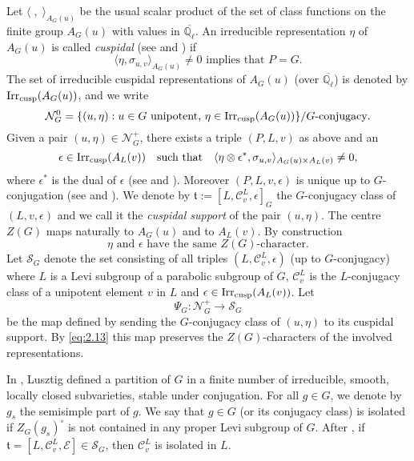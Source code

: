 \documentclass[11pt]{amsart}
\theoremstyle{definition}
\newcommand{\Q}{\mathbb Q}
\def\Irr{{\rm Irr}}
\def\cC{{\mathcal C}}
\def\cS{{\mathcal S}}
\def\cN{{\mathcal N}}
\def\cE{{\mathcal E}}
\def\ft{{\mathfrak t}}
\def\cusp{{\rm cusp}}
\begin{document}
Let $\langle \;,\;\rangle_{A_{G} (u)}$ be the usual scalar product of the set of class 
functions on the finite group $A_{G} (u)$ with values in $\overline{\Q_{\ell}}$. 
An irreducible representation $\eta$ of $A_{G} (u)$ is called \emph{cuspidal} 
(see \cite[Definition 2.4]{Lus1} and \cite[\S 0.4]{LS}) if 
\begin{equation}
\langle \eta,\sigma_{u,v}\rangle_{A_{G} (u)}\ne 0 \text{ implies that } P=G.
\end{equation} 
The set of irreducible cuspidal representations of $A_{G} (u)$ 
(over $\overline{\Q_{\ell}}$) is denoted by $\Irr_\cusp (A_{G} (u))$, and we write
\[
\cN_{G}^0 = \{ (u,\eta ) : u \in G \text{ unipotent, } 
\eta \in \Irr_\cusp (A_{G} (u)) \} 
/ G\text{-conjugacy} .
\]
Given a pair $(u,\eta)\in\cN_{G}^+$, there exists a triple $(P,L,v)$ 
as above and an 
\[
\epsilon\in \Irr_\cusp (A_{L} (v)) \quad \text{such that} \quad 
\langle \eta \otimes \epsilon^*,\sigma_{u,v}\rangle_{A_G (u) \times A_L (v)}\ne 0,
\]
where $\epsilon^*$ is the dual of $\epsilon$ (see \cite[\S~6.2]{Lus1} and 
\cite[\S 0.4]{LS}). Moreover $(P,L,v,\epsilon)$ is unique up to $G$-conjugation 
(see \cite[Prop.~6.3]{Lus1} and \cite{LS}). We denote by 
$\ft:=[L,\cC_v^{L},\epsilon]_{G}$ the $G$-conjugacy class of 
$(L,v,\epsilon)$ and we call it the \emph{cuspidal support} of the pair $(u,\eta)$.
The centre $Z(G)$ maps naturally to $A_{G}(u)$ and to $A_L (v)$. 
By construction \cite[Theorem 6.5.a]{Lus1}
\begin{equation}\label{eq:2.13}
\eta \text{ and } \epsilon \text{ have the same } Z(G)\text{-character.}  
\end{equation}
Let $\cS_{G}$ denote the set consisting of all triples $(L,\cC_v^{L},\epsilon)$ 
(up to $G$-conjugacy) where $L$ is a Levi subgroup of a parabolic subgroup of $G$,
$\cC_v^{L}$ is the $L$-conjugacy class of a unipotent element $v$ in $L$ and 
$\epsilon\in\Irr_\cusp (A_{L} (v))$. Let 
\begin{equation}\label{eq:2.1}
\Psi_{G}\colon\cN_{G}^+\to \cS_{G}
\end{equation}
be the map defined by sending the $G$-conjugacy class of $(u,\eta)$ 
to its cuspidal support. By \eqref{eq:2.13} this map preserves the 
$Z(G)$-characters of the involved representations.

In \cite[§3.1]{Lus1}, Lusztig defined a partition of $G$ in a finite number of 
irreducible, smooth, locally closed subvarieties, stable under conjugation. 
For all $g \in G$, we denote by $g_s$ the semisimple part of $g$. We say that 
$g \in G$ (or its conjugacy class) is isolated if $Z_{G}(g_s)^{\circ}$ is not 
contained in any proper Levi subgroup of $G$. After \cite[2.7]{Lus1}, if 
$\mathfrak{t}=[L,\mathcal{C}_{v}^{L},\cE] \in \mathcal{S}_{G}$, then 
$\mathcal{C}_{v}^{L}$ is isolated in $L$.
\end{document}
